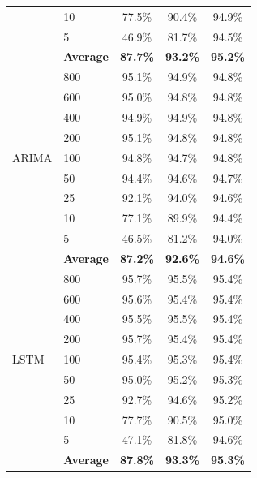 \documentclass[11pt,a4paper]{article}
\begin{document}
\begin{table}[H]
\begin{tabular}{llccc}
 & 10  & 77.5\% & 90.4\% & 94.9\% \\
 & 5   & 46.9\% & 81.7\% & 94.5\% \\
 & \textbf{Average} & \textbf{87.7\%} & \textbf{93.2\%} & \textbf{95.2\%} \\
\midrule
\multirow{9}{*}{ARIMA}
 & 800 & 95.1\% & 94.9\% & 94.8\% \\
 & 600 & 95.0\% & 94.8\% & 94.8\% \\
 & 400 & 94.9\% & 94.9\% & 94.8\% \\
 & 200 & 95.1\% & 94.8\% & 94.8\% \\
 & 100 & 94.8\% & 94.7\% & 94.8\% \\
 & 50  & 94.4\% & 94.6\% & 94.7\% \\
 & 25  & 92.1\% & 94.0\% & 94.6\% \\
 & 10  & 77.1\% & 89.9\% & 94.4\% \\
 & 5   & 46.5\% & 81.2\% & 94.0\% \\
 & \textbf{Average} & \textbf{87.2\%} & \textbf{92.6\%} & \textbf{94.6\%} \\
\midrule
\multirow{9}{*}{LSTM}
 & 800 & 95.7\% & 95.5\% & 95.4\% \\
 & 600 & 95.6\% & 95.4\% & 95.4\% \\
 & 400 & 95.5\% & 95.5\% & 95.4\% \\
 & 200 & 95.7\% & 95.4\% & 95.4\% \\
 & 100 & 95.4\% & 95.3\% & 95.4\% \\
 & 50  & 95.0\% & 95.2\% & 95.3\% \\
 & 25  & 92.7\% & 94.6\% & 95.2\% \\
 & 10  & 77.7\% & 90.5\% & 95.0\% \\
 & 5   & 47.1\% & 81.8\% & 94.6\% \\
 & \textbf{Average} & \textbf{87.8\%} & \textbf{93.3\%} & \textbf{95.3\%} \\
\bottomrule
\end{tabular}
\end{table}
\end{document}
